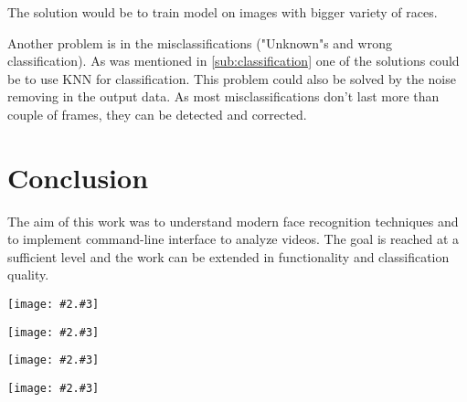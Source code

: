 \documentclass[hidelinks, english]{mvi-report}
\newcommand{\smplimage}[3][1]{
\centerline{
\texttt{[image: \#2.\#3]}
}
}
\begin{document}
    The solution would be to train model on images with bigger variety of races.

    Another problem is in the misclassifications ("Unknown"s and wrong classification). As was mentioned in
    \cref{sub:classification} one of the solutions could be to use KNN for classification. This problem could also be solved
    by the noise removing in the output data. As most misclassifications don't last more than couple of frames, they can be
    detected and corrected.


    \section{Conclusion}

    The aim of this work was to understand modern face recognition techniques and to implement command-line interface to
    analyze videos. The goal is reached at a sufficient level and the work can be extended in functionality and
    classification quality.


    

    \begin{figure*}[t]
        \centering
        \smplimage[1]{pulp_fiction}{png}
        \caption{Pulp fiction analysis.}
        \label{fig:pulp_fiction}
    \end{figure*}

    \begin{figure*}[t]
        \centering
        \smplimage[1]{reservoir_dogs}{png}
        \caption{Reservoir dogs analysis.}
        \label{fig:reservoir_dogs}
    \end{figure*}

    \begin{figure*}[t]
        \centering
        \smplimage[1]{rd_frame}{png}
        \caption{Reservoir dogs frame with highlighted and named faces.}
        \label{fig:rd_frame}
    \end{figure*}

    \begin{figure*}[t]
        \centering
        \smplimage[1]{pf_error}{png}
        \caption{Misclassification of non european face (actual frame from the outputed video). Athors photo was included in
        the searched cast. It was (obviously falsely) classified in 5 frames in \textit{Pulp Fiction}, in 3 frames in
        \textit{Kill Bill: Vol. 1}, 1 in \textit{Kill Bill: Vol. 2}, in 37! frames in \textit{Inglourious Basterds} and none
        in \textit{Reservoir Dogs}.}
        \label{fig:pf_misclass}
    \end{figure*}
\end{document}
